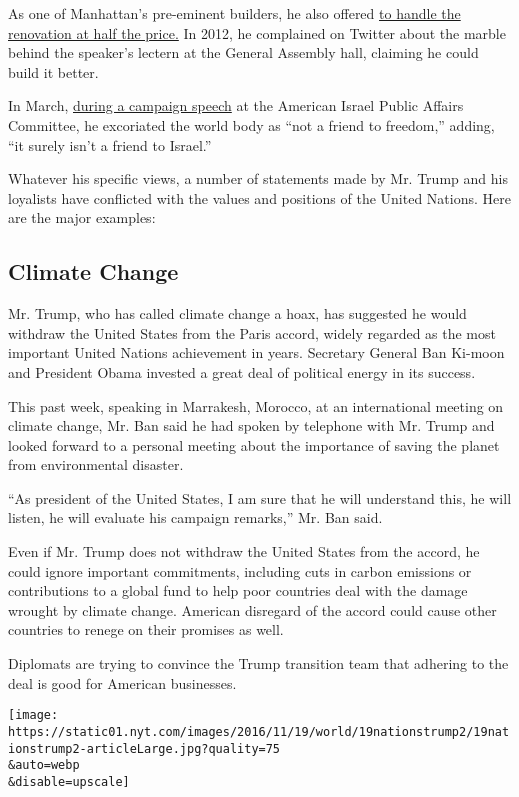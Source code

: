As one of Manhattan's pre-eminent builders, he also offered
\href{http://www.cbsnews.com/news/trump-touts-un-renovation-plan/}{to
handle the renovation at half the price.} In 2012, he complained on
Twitter about the marble behind the speaker's lectern at the General
Assembly hall, claiming he could build it better.

In March,
\href{https://www.donaldjtrump.com/media/donald-j-trump-remarks-at-aipac}{during
a campaign speech} at the American Israel Public Affairs Committee, he
excoriated the world body as ``not a friend to freedom,'' adding, ``it
surely isn't a friend to Israel.''

Whatever his specific views, a number of statements made by Mr. Trump
and his loyalists have conflicted with the values and positions of the
United Nations. Here are the major examples:

\hypertarget{climate-change}{%
\subsection{Climate Change}\label{climate-change}}

Mr. Trump, who has called climate change a hoax, has suggested he would
withdraw the United States from the Paris accord, widely regarded as the
most important United Nations achievement in years. Secretary General
Ban Ki-moon and President Obama invested a great deal of political
energy in its success.

This past week, speaking in Marrakesh, Morocco, at an international
meeting on climate change, Mr. Ban said he had spoken by telephone with
Mr. Trump and looked forward to a personal meeting about the importance
of saving the planet from environmental disaster.

``As president of the United States, I am sure that he will understand
this, he will listen, he will evaluate his campaign remarks,'' Mr. Ban
said.

Even if Mr. Trump does not withdraw the United States from the accord,
he could ignore important commitments, including cuts in carbon
emissions or contributions to a global fund to help poor countries deal
with the damage wrought by climate change. American disregard of the
accord could cause other countries to renege on their promises as well.

Diplomats are trying to convince the Trump transition team that adhering
to the deal is good for American businesses.

\texttt{[image: https://static01.nyt.com/images/2016/11/19/world/19nationstrump2/19nationstrump2-articleLarge.jpg?quality=75\\\&auto=webp\\\&disable=upscale]}

